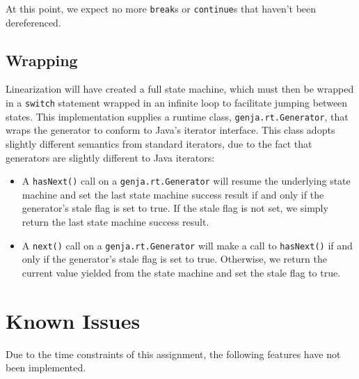\documentclass[journal,a4paper]{IEEEtran}
\begin{document}
At this point, we expect no more \texttt{break}s or \texttt{continue}s that haven't been
dereferenced.

\subsection{Wrapping}

Linearization will have created a full state machine, which must then be wrapped in a
\texttt{switch} statement wrapped in an infinite loop to facilitate jumping between states. This
implementation supplies a runtime class, \texttt{genja.rt.Generator}, that wraps the generator to
conform to Java's iterator interface. This class adopts slightly different semantics from standard
iterators, due to the fact that generators are slightly different to Java iterators:

\begin{itemize}
\item A \texttt{hasNext()} call on a \texttt{genja.rt.Generator} will resume the underlying state
machine and set the last state machine success result if and only if the generator's stale flag is
set to true. If the stale flag is not set, we simply return the last state machine success result.

\item A \texttt{next()} call on a \texttt{genja.rt.Generator} will make a call to
\texttt{hasNext()} if and only if the generator's stale flag is set to true. Otherwise, we return
the current value yielded from the state machine and set the stale flag to true.
\end{itemize}

\section{Known Issues}

Due to the time constraints of this assignment, the following features have not been implemented.
\end{document}
